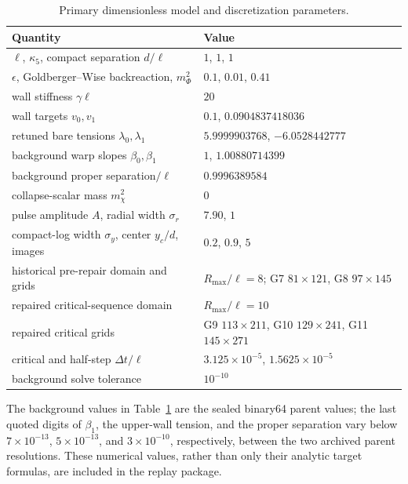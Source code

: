 \documentclass[11pt]{article}
\begin{document}
\begin{table}[ht]
\centering
\caption{Primary dimensionless model and discretization parameters.}
\label{tab:model-parameters}
\begin{tabular}{@{}ll@{}}
\toprule
Quantity & Value \\
\midrule
$\ell$, $\kappa_5$, compact separation $d/\ell$ & $1$, $1$, $1$ \\
$\epsilon$, Goldberger--Wise backreaction, $m_\Phi^2$ & $0.1$, $0.01$, $0.41$ \\
wall stiffness $\gamma\ell$ & $20$ \\
wall targets $v_0,v_1$ & $0.1$, $0.0904837418036$ \\
retuned bare tensions $\lambda_0,\lambda_1$ & $5.9999903768$, $-6.0528442777$ \\
background warp slopes $\beta_0,\beta_1$ & $1$, $1.00880714399$ \\
background proper separation$/\ell$ & $0.9996389584$ \\
collapse-scalar mass $m_\chi^2$ & $0$ \\
pulse amplitude $A$, radial width $\sigma_r$ & $7.90$, $1$ \\
compact-log width $\sigma_y$, center $y_c/d$, images & $0.2$, $0.9$, $5$ \\
historical pre-repair domain and grids & $R_{\max}/\ell=8$; G7 $81\times121$, G8 $97\times145$ \\
repaired critical-sequence domain & $R_{\max}/\ell=10$ \\
repaired critical grids & G9 $113\times211$, G10 $129\times241$, G11 $145\times271$ \\
critical and half-step $\Delta t/\ell$ & $3.125\times10^{-5}$, $1.5625\times10^{-5}$ \\
background solve tolerance & $10^{-10}$ \\
\bottomrule
\end{tabular}
\end{table}

The background values in Table~\ref{tab:model-parameters} are the sealed
binary64 parent values; the last quoted digits of $\beta_1$, the upper-wall
tension, and the proper separation vary below $7\times10^{-13}$,
$5\times10^{-13}$, and $3\times10^{-10}$, respectively, between the two
archived parent resolutions.  These numerical values, rather than only their
analytic target formulas, are included in the replay package.
\end{document}

